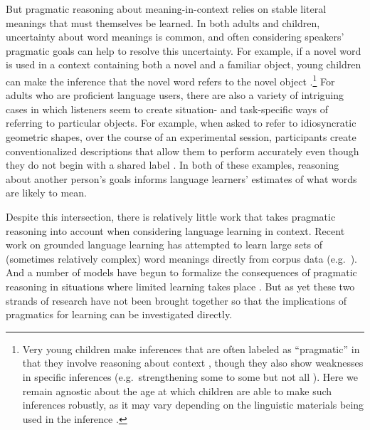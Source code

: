 \documentclass{article} %
\begin{document}
But pragmatic reasoning about meaning-in-context relies on stable literal meanings that must  themselves be learned.
In both adults and children, uncertainty about word meanings is
common, and often considering speakers' pragmatic goals can help to resolve this uncertainty. For example,
if a novel word is used in a context containing both a novel and a
familiar object, young children can make the inference
that the novel word refers to the novel object \cite{markman1988}.\footnote{Very young children
  make inferences that are often labeled as ``pragmatic'' in that they
  involve reasoning about context \cite{clark1988,baldwin1993}, though
  they also show weaknesses in specific inferences (e.g.~strengthening
  {\sc some} to {\sc some but not all} \cite{papafragou2003}). Here we
  remain agnostic about the age at which children are able to make
  such inferences robustly, as it may vary depending on the linguistic
  materials being used in the inference \cite{barner2011}.} For adults
who are proficient language users, there are also a variety of intriguing cases
in which listeners seem to create situation- and task-specific ways of
referring to particular objects. For example, when asked to refer to
idiosyncratic geometric shapes, over the course of an experimental
session, participants create conventionalized descriptions that allow
them to perform accurately even though they do not begin with a shared
label \cite{krauss1964,clark1986}. In both of these examples, reasoning about another person's goals informs language learners' estimates of what words are likely to mean. 


Despite this intersection, there is relatively little work that takes pragmatic reasoning into account when considering language learning in context. Recent work on grounded language learning has attempted to learn large sets of (sometimes relatively complex) word meanings directly from corpus data
(e.g.~\cite{zettlemoyer2005,chen2008,frank2009,kwiatkowski2010,johnson2012}). And
a number of models have begun to formalize the consequences of
pragmatic reasoning in situations where limited learning takes place
\cite{golland2010,frank2012,bergen2012}. But as yet these two strands
of research have not been brought together so that the implications of
pragmatics for learning can be investigated directly.
\end{document}
